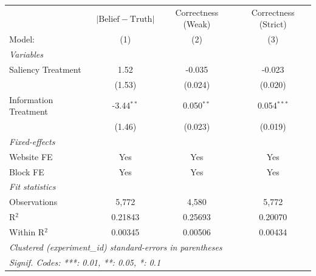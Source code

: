\begin{tabular}{lccc}
   \tabularnewline \midrule \midrule
                         & $\lvert \text{Belief} - \text{Truth} \rvert$     & Correctness (Weak) & Correctness (Strict) \\   
   Model:                & (1)                                              & (2)                & (3)\\  
   \midrule
   \emph{Variables}\\
   Saliency Treatment    & 1.52                                             & -0.035             & -0.023\\   
                         & (1.53)                                           & (0.024)            & (0.020)\\   
   Information Treatment & -3.44$^{**}$                                     & 0.050$^{**}$       & 0.054$^{***}$\\   
                         & (1.46)                                           & (0.023)            & (0.019)\\   
   \midrule
   \emph{Fixed-effects}\\
   Website FE            & Yes                                              & Yes                & Yes\\  
   Block FE              & Yes                                              & Yes                & Yes\\  
   \midrule
   \emph{Fit statistics}\\
   Observations          & 5,772                                            & 4,580              & 5,772\\  
   R$^2$                 & 0.21843                                          & 0.25693            & 0.20070\\  
   Within R$^2$          & 0.00345                                          & 0.00506            & 0.00434\\  
   \midrule \midrule
   \multicolumn{4}{l}{\emph{Clustered (experiment\_id) standard-errors in parentheses}}\\
   \multicolumn{4}{l}{\emph{Signif. Codes: ***: 0.01, **: 0.05, *: 0.1}}\\
\end{tabular}
